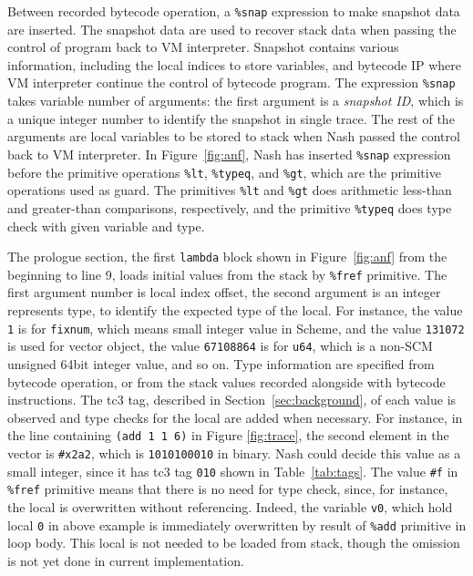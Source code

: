 \documentclass[preprint]{sigplanconf}
\begin{document}
Between recorded bytecode operation, a \texttt{\%snap} expression to make
snapshot data are inserted. The snapshot data are used to recover stack data
when passing the control of program back to VM interpreter. Snapshot contains
various information, including the local indices to store variables, and
bytecode IP where VM interpreter continue the control of bytecode program. The
expression \texttt{\%snap} takes variable number of arguments: the first
argument is a \textit{snapshot ID}, which is a unique integer number to
identify the snapshot in single trace. The rest of the arguments are local
variables to be stored to stack when Nash passed the control back to VM
interpreter. In Figure~\hyperref[fig:anf]{\ref{fig:anf}}, Nash has inserted
\texttt{\%snap} expression before the primitive operations \texttt{\%lt},
\texttt{\%typeq}, and \texttt{\%gt}, which are the primitive operations used
as guard. The primitives \texttt{\%lt} and \texttt{\%gt} does arithmetic
less-than and greater-than comparisons, respectively, and the primitive
\texttt{\%typeq} does type check with given variable and type.

The prologue section, the first \texttt{lambda} block shown in
Figure~\hyperref[fig:anf]{\ref{fig:anf}} from the beginning to line 9, loads
initial values from the stack by \texttt{\%fref} primitive. The first argument
number is local index offset, the second argument is an integer represents
type, to identify the expected type of the local. For instance, the value
\texttt{1} is for \texttt{fixnum}, which means small integer value in Scheme,
and the value \texttt{131072} is used for vector object, the value
\texttt{67108864} is for \texttt{u64}, which is a non-SCM unsigned 64bit
integer value, and so on. Type information are specified from bytecode
operation, or from the stack values recorded alongside with bytecode
instructions. The tc3 tag, described in Section~\ref{sec:background}, of each
value is observed and type checks for the local are added when necessary. For
instance, in the line containing \texttt{(add 1 1 6)} in Figure
\hyperref[fig:trace]{\ref{fig:trace}}, the second element in the vector is
\texttt{\#x2a2}, which is \texttt{1010100010} in binary. Nash could decide
this value as a small integer, since it has tc3 tag \texttt{010} shown in
Table~\hyperref[tab:tags]{\ref{tab:tags}}. The value \texttt{\#f} in
\texttt{\%fref} primitive means that there is no need for type check, since,
for instance, the local is overwritten without referencing. Indeed, the
variable \texttt{v0}, which hold local \texttt{0} in above example is
immediately overwritten by result of \texttt{\%add} primitive in loop
body. This local is not needed to be loaded from stack, though the omission is
not yet done in current implementation.
\end{document}
